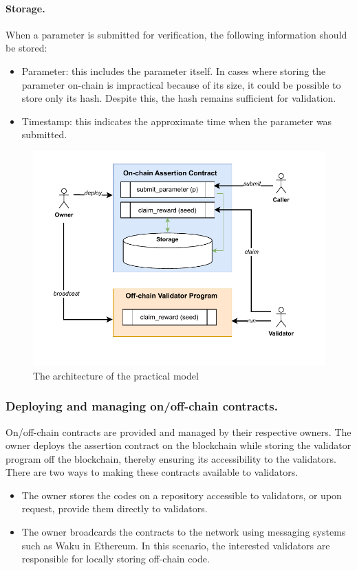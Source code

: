 \documentclass[runningheads]{llncs}
\begin{document}
\paragraph{Storage.}
When a parameter is submitted for verification, the following information should be stored:
\begin{itemize}
\item Parameter: this includes the parameter itself. In cases where storing the parameter on-chain is impractical because of its size, it could be possible to store only its hash. Despite this, the hash remains sufficient for validation.
\item Timestamp: this indicates the approximate time when the parameter was submitted.
\end{itemize}
\begin{figure}
\centering
\includegraphics[scale=.8]{assertion}
\caption{The architecture of the practical model}
\label{fig.architect}
\end{figure}

\subsubsection{Deploying and managing on/off-chain contracts.}
On/off-chain contracts are provided and managed by their respective owners. The owner deploys the assertion contract on the blockchain while storing the validator program off the blockchain, thereby ensuring its accessibility to the validators. There are two ways to making these contracts available to validators.
\begin{itemize}
\item The owner stores the codes on a repository accessible to validators, or upon request, provide them directly to validators.
\item The owner broadcards the contracts to the network using messaging systems such as Waku in Ethereum. In this scenario, the interested validators are responsible for locally storing off-chain code.
\end{itemize}
\end{document}
